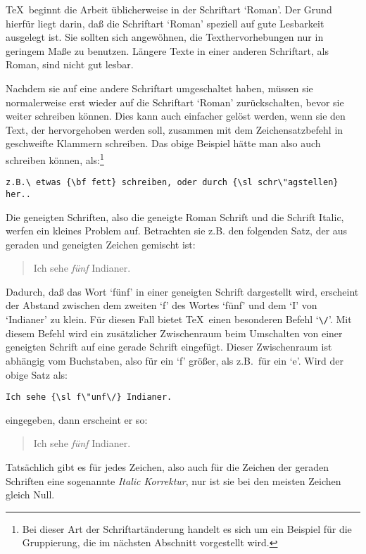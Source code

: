\TeX\ beginnt die Arbeit \"ublicherweise in der Schriftart 
`Roman'. Der
Grund hierf\"ur liegt darin, da\ss{} die Schriftart `Roman' speziell auf
gute Lesbarkeit ausgelegt ist. Sie sollten sich angew\"ohnen, die
Texthervorhebungen nur in geringem Ma\ss{}e zu benutzen. L\"angere Texte in
einer anderen Schriftart, als Roman, sind nicht gut lesbar.

Nachdem sie auf eine andere Schriftart umgeschaltet haben, m\"ussen sie
normalerweise erst wieder auf die Schriftart 
`Roman' zur\"uckschalten,
bevor sie weiter schreiben k\"onnen. Dies kann auch einfacher gel\"ost
werden, wenn sie den Text, der hervorgehoben werden soll, zusammen mit
dem Zeichensatzbefehl in geschweifte 
Klammern schreiben. Das obige
Beispiel h\"atte man also auch schreiben k\"onnen, als:\footnote{Bei dieser
Art der Schriftart\"anderung handelt es sich um ein Beispiel f\"ur die
Gruppierung, die im n\"achsten Abschnitt vorgestellt wird.}
\begin{verbatim}
z.B.\ etwas {\bf fett} schreiben, oder durch {\sl schr\"agstellen} her..
\end{verbatim}
Die geneigten Schriften, also die geneigte 
Roman Schrift und die Schrift 
Italic, werfen ein kleines Problem auf. Betrachten sie z.B.
den folgenden Satz, der aus geraden und geneigten Zeichen gemischt ist:
\begin{quote}
Ich sehe {\sl f\"unf} Indianer.
\end{quote}
Dadurch, da\ss{} das Wort `f\"unf' in einer geneigten Schrift dargestellt
wird, erscheint der 
Abstand zwischen dem zweiten `f' des Wortes `f\"unf'
und dem `I' von `Indianer' zu klein. F\"ur diesen Fall bietet \TeX\
einen besonderen Befehl `\verb|\/|'. Mit diesem Befehl wird ein
zus\"atzlicher 
Zwischenraum beim Umschalten von einer geneigten Schrift
auf eine gerade Schrift eingef\"ugt. Dieser Zwischenraum ist abh\"angig
vom Buchstaben, also f\"ur ein `f' 
gr\"o\ss{}er, als z.B.\ f\"ur ein `e'. Wird der obige Satz als:
\begin{verbatim}
Ich sehe {\sl f\"unf\/} Indianer.
\end{verbatim}
eingegeben, dann erscheint er so:
\begin{quote}
Ich sehe {\sl f\"unf\/} Indianer.
\end{quote}
Tats\"achlich gibt es f\"ur jedes Zeichen, also auch f\"ur die Zeichen der
geraden Schriften eine sogenannte \index{Italic!Korrektur}
{\em Italic Korrektur}, nur ist sie
bei den meisten Zeichen gleich Null.

